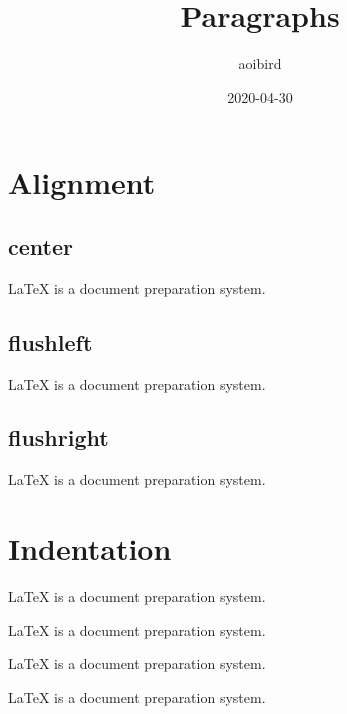 \documentclass{article}
\title{Paragraphs}
\author{aoibird}
\date{2020-04-30}
\begin{document}
\maketitle

\section{Alignment}

\subsection{center}
\begin{center}
  LaTeX is a document preparation system.
\end{center}

\subsection{flushleft}
\begin{flushleft}
  LaTeX is a document preparation system.
\end{flushleft}

\subsection{flushright}
\begin{flushright}
  LaTeX is a document preparation system.
\end{flushright}

\section{Indentation}
\setlength{\parindent}{1cm}
\setlength{\parskip}{1cm plus 4mm minus 3mm}

LaTeX is a document preparation system.

\noindent LaTeX is a document preparation system.

LaTeX is a document preparation system.

LaTeX is a document preparation system.
\end{document}
